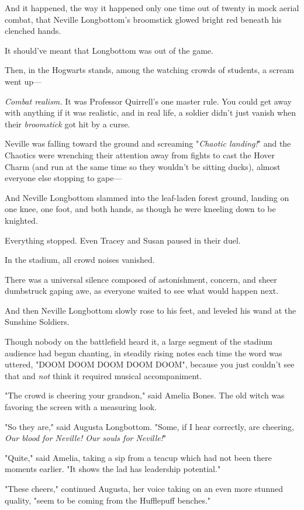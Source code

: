 And it happened, the way it happened only one time out of twenty in mock aerial
combat, that Neville Longbottom's broomstick glowed bright red beneath his
clenched hands.

It should've meant that Longbottom was out of the game.

Then, in the Hogwarts stands, among the watching crowds of students, a scream
went up---

\emph{Combat realism.} It was Professor Quirrell's one master rule. You could
get away with anything if it was realistic, and in real life, a soldier didn't
just vanish when their \emph{broomstick} got hit by a curse.

Neville was falling toward the ground and screaming "\emph{Chaotic landing!}"
and the Chaotics were wrenching their attention away from fights to cast the
Hover Charm (and run at the same time so they wouldn't be sitting ducks),
almost everyone else stopping to gape---

And Neville Longbottom slammed into the leaf-laden forest ground, landing on
one knee, one foot, and both hands, as though he were kneeling down to be
knighted.

Everything stopped. Even Tracey and Susan paused in their duel.

In the stadium, all crowd noises vanished.

There was a universal silence composed of astonishment, concern, and sheer
dumbstruck gaping awe, as everyone waited to see what would happen next.

And then Neville Longbottom slowly rose to his feet, and leveled his wand at
the Sunshine Soldiers.

Though nobody on the battlefield heard it, a large segment of the stadium
audience had begun chanting, in steadily rising notes each time the word was
uttered, "DOOM DOOM DOOM DOOM DOOM", because you just couldn't see that and
\emph{not} think it required musical accompaniment.

"The crowd is cheering your grandson," said Amelia Bones. The old witch was
favoring the screen with a measuring look.

"So they are," said Augusta Longbottom. "Some, if I hear correctly, are
cheering, \emph{Our blood for Neville! Our souls for Neville!}"

"Quite," said Amelia, taking a sip from a teacup which had not been there
moments earlier. "It shows the lad has leadership potential."

"These cheers," continued Augusta, her voice taking on an even more stunned
quality, "seem to be coming from the Hufflepuff benches."

